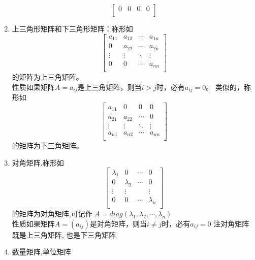 \begin{enumerate}
{$$         \left[ \begin{matrix}
            0 & 0 & 0 & 0  \\
         \end{matrix} \right]         
        $$
    }
    \item{
        上三角形矩阵和下三角形矩阵：称形如
        $$
        \left[ \begin{matrix}
            {{a}_{11}} & {{a}_{12}} & \cdots  & {{a}_{1n}}  \\
            0 & {{a}_{22}} & \cdots  & {{a}_{2n}}  \\
            \vdots  & \vdots  & {\ddots} & \vdots   \\
            0 & 0 & \cdots  & {{a}_{nn}}  \\
         \end{matrix} \right]         
        $$
        的矩阵为上三角矩阵。\\
        {\color{blue}性质\quad}如果矩阵$A={a_{ij}}$是上三角矩阵，则当$i>j$时，必有$a_{ij}=0$。
        类似的，称形如
         $$
         \left[ \begin{matrix}
            {{a}_{11}} & 0 & 0 & 0  \\
            {{a}_{21}} & {{a}_{22}} & \cdots  & 0  \\
            \vdots  & \vdots  & {\ddots} & \vdots   \\
            {{a}_{n1}} & {{a}_{n2}} & \cdots  & {{a}_{nn}}  \\
         \end{matrix} \right]         
         $$
        的矩阵为下三角矩阵。
    }
    \item{
        对角矩阵,称形如
        $$
        \left[ \begin{matrix}
            \lambda_{1} & 0 & \cdots  & 0  \\
            0 & \lambda_{2} & \cdots  & 0  \\
            \vdots  & \vdots  & {} & \vdots   \\
            0 & 0 & \cdots  & \lambda_{n}  \\
        \end{matrix} \right]
        $$
        的矩阵为对角矩阵,可记作
         $A=diag(\lambda_{1},\lambda_{2},\cdots,\lambda_{n})$ \\
        {\color{blue}性质\quad}如果矩阵$A=({a}_{ij})$是对角矩阵，则当$i\neq j$时，必有$a_{ij}=0$
        {\color{red}注\quad}对角矩阵既是上三角矩阵, 也是下三角矩阵
    }
    \item{
        数量矩阵,单位矩阵 \\
}
\end{enumerate}
